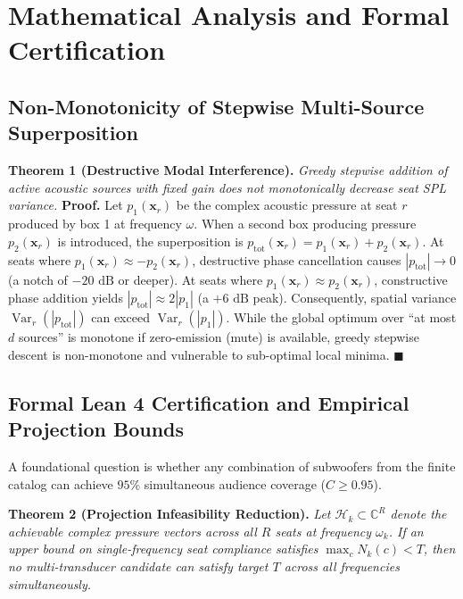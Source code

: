 \documentclass[11pt,a4paper]{article}
\newenvironment{proof}{\noindent\textbf{Proof.}}{\hfill$\blacksquare$\vspace{0.5em}\par}
\begin{document}
\section{Mathematical Analysis and Formal Certification}

\subsection{Non-Monotonicity of Stepwise Multi-Source Superposition}
\noindent \textbf{Theorem 1 (Destructive Modal Interference).} \textit{Greedy stepwise addition of active acoustic sources with fixed gain does not monotonically decrease seat SPL variance.}
\begin{proof}
Let $p_1(\mathbf{x}_r)$ be the complex acoustic pressure at seat $r$ produced by box 1 at frequency $\omega$. When a second box producing pressure $p_2(\mathbf{x}_r)$ is introduced, the superposition is $p_{\text{tot}}(\mathbf{x}_r) = p_1(\mathbf{x}_r) + p_2(\mathbf{x}_r)$. At seats where $p_1(\mathbf{x}_r) \approx -p_2(\mathbf{x}_r)$, destructive phase cancellation causes $|p_{\text{tot}}| \to 0$ (a notch of $-20\text{ dB}$ or deeper). At seats where $p_1(\mathbf{x}_r) \approx p_2(\mathbf{x}_r)$, constructive phase addition yields $|p_{\text{tot}}| \approx 2 |p_1|$ (a $+6\text{ dB}$ peak). Consequently, spatial variance $\operatorname{Var}_r(|p_{\text{tot}}|)$ can exceed $\operatorname{Var}_r(|p_1|)$. While the global optimum over ``at most $d$ sources'' is monotone if zero-emission (mute) is available, greedy stepwise descent is non-monotone and vulnerable to sub-optimal local minima.
\end{proof}

\subsection{Formal Lean 4 Certification and Empirical Projection Bounds}
A foundational question is whether any combination of subwoofers from the finite catalog can achieve $95\%$ simultaneous audience coverage ($C \ge 0.95$).

\noindent \textbf{Theorem 2 (Projection Infeasibility Reduction).} \textit{Let $\mathcal{H}_k \subset \mathbb{C}^R$ denote the achievable complex pressure vectors across all $R$ seats at frequency $\omega_k$. If an upper bound on single-frequency seat compliance satisfies $\max_{c} N_k(c) < T$, then no multi-transducer candidate can satisfy target $T$ across all frequencies simultaneously.}
\end{document}
